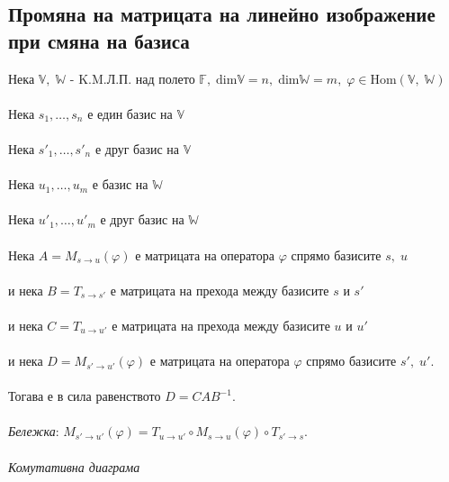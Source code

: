\documentclass{article}
\newcommand{\V}{\mathbb{V}}
\newcommand{\F}{\mathbb{F}}
\newcommand{\W}{\mathbb{W}}
\newcommand{\n}[1]{#1_1, \dots, #1_n}
\newcommand{\m}[1]{#1_1, \dots, #1_m}
\begin{document}
    \subsection{Промяна на матрицата на линейно изображение при смяна на базиса}
    Нека \(\V, \; \W\) - K.M.Л.П. над полето \(\F, \; \mathrm{dim}\V = n, \; \mathrm{dim}\W = m, \; \varphi \in \mathrm{Hom}(\V, \; \W)\) \\\\
    Нека \(\n{s}\) е един базис на \(\V\) \\\\
    Нека \(\n{s'}\) е друг базис на \(\V\) \\\\
    Нека \(\m{u}\) е базис на \(\W\) \\\\
    Нека \(\m{u'}\) е друг базис на \(\W\) \\\\
    Нека \(A = M_{s \to u}(\varphi)\) е матрицата на оператора \(\varphi\) спрямо базисите \(s, \; u\) \\\\
    и нека \(B = T_{s \to s'}\) е матрицата на прехода между базисите \(s\) и \(s'\) \\\\
    и нека \(C = T_{u \to u'}\) е матрицата на прехода между базисите \(u\) и \(u'\) \\\\
    и нека \(D = M_{s' \to u'}(\varphi)\) е матрицата на оператора \(\varphi\) спрямо базисите \(s', \; u'\). \\\\
    Тогава е в сила равенството \(D = CAB^{-1}\). \\\\
    \textit{Бележка}: \(M_{s' \to u'}(\varphi) = T_{u \to u'} \circ M_{s \to u}(\varphi) \circ T_{s' \to s}\). \\\\
    \textit{Комутативна диаграма} \\\\
\end{document}
